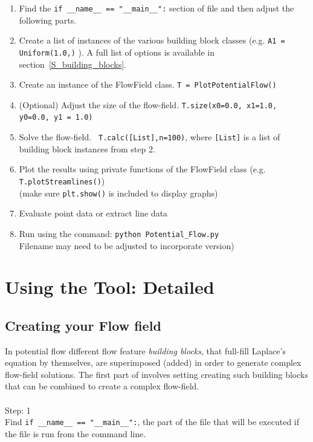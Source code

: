 \documentclass[10pt,a4paper]{article}
\begin{document}
\begin{enumerate}
\item Find the \verb'if __name__ == "__main__":' section of file and then adjust the following parts.
\item Create a list of instances of the various building block classes (e.g. \verb'A1 = Uniform(1.0,)' ). 
A full list of options is available in section~\ref{S_building_blocks}.
\item Create an instance of the FlowField class. \verb'T = PlotPotentialFlow()'
\item (Optional) Adjust the size of the flow-field. \verb'T.size(x0=0.0, x1=1.0, y0=0.0, y1 = 1.0)'
\item Solve the flow-field. \verb' T.calc([List],n=100)', where \verb'[List]' is a list of building block instances from step 2.
\item Plot the results using private functions of the FlowField class (e.g. \verb'T.plotStreamlines()') \\
(make sure \verb'plt.show()' is included to display graphs)
\item Evaluate point data or extract line data
\item Run using the command: \verb'python Potential_Flow.py' \\
Filename may need to be adjusted to incorporate version)   
\end{enumerate}



\section{Using the Tool: Detailed}

\subsection{Creating your Flow field}
In potential flow different flow feature {\it building blocks}, that full-fill Laplace's equation by themselves, are superimposed (added) in order to generate complex flow-field solutions. 
The first part of involves setting creating such building blocks that can be combined to create a complex flow-field.
\\ \\
\noindent
{\huge Step: 1}\\
Find  \verb'if __name__ == "__main__":', the part of the file that will be executed if the file is run from the command line.
\\ \\
\end{document}
